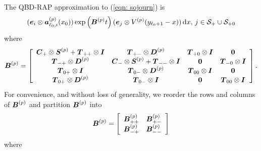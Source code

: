 The QBD-RAP approximation to (\ref{eqn: sojourn}) is 
\begin{align}
	(\boldsymbol e_i\otimes \boldsymbol  a_{\ell_0,i}^{(p)}(x_0)) \exp\left(\boldsymbol{B}^{(p)}t\right)(\boldsymbol e_j \otimes V^{(p)}(y_{\ell_0+1}-x))\, \mathrm{d} x,\,j\in\mathcal{S}_+\cup\mathcal{S}_{+0} \label{eqn: ldll}
\end{align}
where 
\[\boldsymbol{B}^{(p)} = \left[\begin{array}{cccc}
	\boldsymbol{C}_+\otimes \boldsymbol{S}^{(p)} + \boldsymbol{T}_{++}\otimes \boldsymbol{I} & \boldsymbol{T}_{+-}\otimes \boldsymbol{D}^{(p)} & \boldsymbol{T}_{+0}\otimes \boldsymbol{I} & \boldsymbol 0 \\
	\boldsymbol{T}_{-+}\otimes \boldsymbol{D}^{(p)} & \boldsymbol{C}_-\otimes \boldsymbol{S}^{(p)} + \boldsymbol{T}_{--}\otimes \boldsymbol{I} &\boldsymbol 0 & \boldsymbol{T}_{-0}\otimes \boldsymbol{I} \\
	\boldsymbol{T}_{0+}\otimes \boldsymbol{I} & \boldsymbol{T}_{0-}\otimes \boldsymbol{D}^{(p)} & \boldsymbol{T}_{00}\otimes \boldsymbol{I} & \boldsymbol 0 \\
	\boldsymbol{T}_{0+}\otimes \boldsymbol{D}^{(p)} & \boldsymbol{T}_{0-}\otimes \boldsymbol{I} &\boldsymbol 0 & \boldsymbol{T}_{00}\otimes \boldsymbol{I} 
	\end{array}\right].
\] 
For convenience, and without loss of generality, we reorder the rows and columns of \(\boldsymbol B^{(p)}\) and partition \(\boldsymbol{B}^{(p)}\) into 
\begin{align}
	\boldsymbol B^{(p)} = \left[\begin{array}{ccc} \boldsymbol B_{++}^{(p)} & \boldsymbol B_{+-}^{(p)} \\ \boldsymbol B_{-+}^{(p)} & \boldsymbol B_{--}^{(p)}\end{array}\right]
\end{align}
where 
